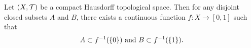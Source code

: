 \documentclass[../sean_thesis.tex]{subfiles}
\begin{document}

\begin{theorem}
	Let $(X, \mathcal{T})$ be a compact Hausdorff topological space. Then for any disjoint closed subsets $A$ and $B$, there exists a continuous function $f: X \to [0,1]$ such that
	\begin{equation*}
		A \subset f^{-1}(\left\{0\right\}) \text{ and }
		B \subset f^{-1}(\left\{1\right\}).
	\end{equation*}
\end{theorem}
\end{document}
